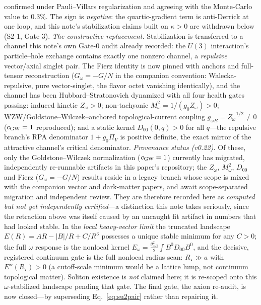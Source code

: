 \documentclass[11pt,a4paper]{article}
\begin{document}
confirmed under Pauli--Villars regularization and agreeing with
the Monte-Carlo value to $0.3\%$.  The sign is \emph{negative}:
the quartic-gradient term is anti-Derrick at one loop, and this
note's stabilization claims built on $\kappa > 0$ are withdrawn
below (S2-1, Gate 3).
\emph{The constructive replacement.}  Stabilization is
transferred to a channel this note's own Gate-0 audit already
recorded: the $U(3)$ interaction's particle--hole exchange
contains exactly one nonzero channel, a \emph{repulsive}
vector/axial singlet pair.  The Fierz identity is now pinned with
anchors and full-tensor reconstruction ($G_\omega = -G/N$ in the
companion convention: Walecka-repulsive, pure vector-singlet, the
flavor octet vanishing identically), and the channel has been
Hubbard--Stratonovich dynamized with all four health gates
passing: induced kinetic $Z_\omega > 0$; non-tachyonic
$M_\omega^2 = 1/(g_0 Z_\omega) > 0$; WZW/Goldstone--Wilczek--anchored topological-current coupling
$g_{\omega B} = Z_\omega^{-1/2} \neq 0$
($c_{\rm GW} = 1$ reproduced); and a static
kernel $D_{00}(0,q) > 0$ for all $q$---the repulsive branch's RPA
denominator $1 + g_0\Pi_V$ is positive definite, the exact mirror
of the attractive channel's critical denominator.
\emph{Provenance status (v0.22).}  Of these, only the
Goldstone--Wilczek normalization ($c_{\rm GW} = 1$) currently has
migrated, independently re-runnable artifacts in this paper's
repository; the $Z_\omega$, $M_\omega^2$, $D_{00}$ and Fierz
($G_\omega = -G/N$) results reside in a legacy branch whose scope
is mixed with the companion vector and dark-matter papers, and
await scope-separated migration and independent review.  They are
therefore recorded here as \emph{computed but not yet
independently certified}---a distinction this note takes
seriously, since the retraction above was itself caused by an
uncaught fit artifact in numbers that had looked stable.  In the \emph{local heavy-vector limit} the truncated landscape
$E(R) = AR - |B|/R + C/R^3$ possesses a unique stable minimum for
any $C > 0$; the full $\omega$ response is the nonlocal kernel
$E_\omega = \tfrac{g_{\omega B}^2}{2}\int B^0 D_{00} B^0$, and the
decisive, registered continuum gate is the full nonlocal radius
scan: $R_\star \gg a$ with $E''(R_\star) > 0$ (a cutoff-scale
minimum would be a lattice lump, not continuum topological
matter).  Soliton existence is \emph{not} claimed here; it is
re-scoped onto this $\omega$-stabilized landscape pending that
gate.
The final gate, the axion re-audit, is now closed---by
superseding Eq.~\eqref{eq:su2pair} rather than repairing it.
\end{document}
